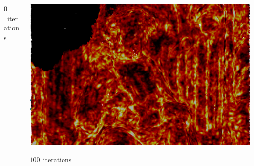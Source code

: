 \documentclass[aspectratio=169,t]{beamer}
\begin{document}
{\begin{columns}
\begin{column}{0.33\textwidth}
			{\footnotesize
				\par \vspace{-1mm} $0$~iterations
			}
		\end{column}
		\begin{column}{0.33\textwidth}
			\centering
			\includegraphics[width=\textwidth]{data/acquired_meshes/unisiegel_100iter.png}
			{\footnotesize
				\par \vspace{-1mm} $100$~iterations
			}
		\end{column}
	\end{columns}
}
\end{document}
